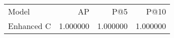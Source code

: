 \begin{tabular}{lrrr}
Model & AP & P@5 & P@10 \\
Enhanced C & 1.000000 & 1.000000 & 1.000000 \\
\end{tabular}
